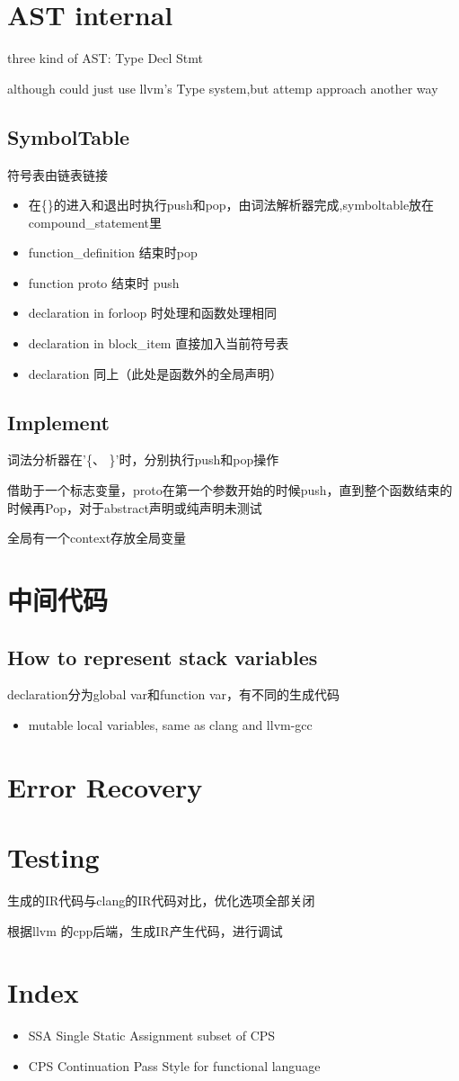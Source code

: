 \documentclass[11pt]{article} %
\begin{document}
\section{AST internal}
three kind of AST: Type Decl Stmt

although could just use llvm's Type system,but attemp approach another way
\subsection{SymbolTable}
符号表由链表链接
\begin{itemize}
\item 在\{\}的进入和退出时执行push和pop，由词法解析器完成,symboltable放在compound\_statement里
\item function\_definition 结束时pop
\item function proto 结束时 push
\item declaration in for\-loop 时处理和函数处理相同
\item declaration in block\_item 直接加入当前符号表
\item declaration 同上（此处是函数外的全局声明）
\end{itemize}

\subsection{Implement}
词法分析器在'\{、 \}'时，分别执行push和pop操作

借助于一个标志变量，proto在第一个参数开始的时候push，直到整个函数结束的时候再Pop，对于abstract声明或纯声明未测试

全局有一个context存放全局变量


\section{中间代码}

\subsection{How to represent stack variables}
declaration分为global var和function var，有不同的生成代码

\begin{itemize}
\item mutable local variables, same as clang and llvm-gcc
\end{itemize}

\section{Error Recovery}

\section{Testing}
生成的IR代码与clang的IR代码对比，优化选项全部关闭


根据llvm 的cpp后端，生成IR产生代码，进行调试

\section{Index}
\begin{itemize}
\item SSA Single Static Assignment subset of CPS
\item CPS Continuation Pass Style for functional language
\end{itemize}
\end{document}
